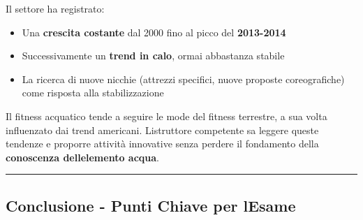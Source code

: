\documentclass[a4paper,11pt]{article}
\providecommand{\tightlist}{%
  \setlength{\itemsep}{0pt}\setlength{\parskip}{0pt}}
\begin{document}
Il settore ha registrato:

\begin{itemize}
      \tightlist
      \item
            Una \textbf{crescita costante} dal 2000 fino al picco del
            \textbf{2013-2014}
      \item
            Successivamente un \textbf{trend in calo}, ormai abbastanza stabile
      \item
            La ricerca di nuove nicchie (attrezzi specifici, nuove proposte
            coreografiche) come risposta alla stabilizzazione
\end{itemize}

Il fitness acquatico tende a seguire le mode del fitness terrestre, a
sua volta influenzato dai trend americani. L\textquotesingle istruttore
competente sa leggere queste tendenze e proporre attività innovative
senza perdere il fondamento della \textbf{conoscenza
      dell\textquotesingle elemento acqua}.

\begin{center}\rule{0.5\linewidth}{0.5pt}\end{center}

\subsection{Conclusione - Punti Chiave per
      l\textquotesingle Esame}\label{conclusione---punti-chiave-per-lesame-10}
\end{document}
